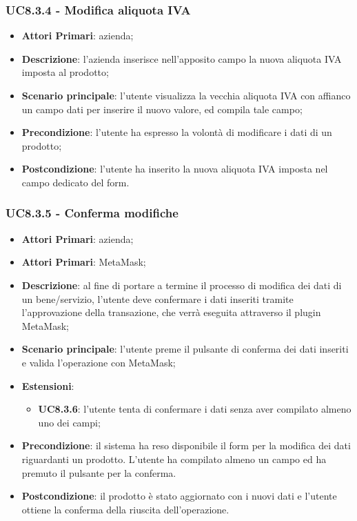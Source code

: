 \subsubsection{UC8.3.4 - Modifica aliquota IVA}
\begin{itemize}
	\item \textbf{Attori Primari}: azienda;
	\item \textbf{Descrizione}: l'azienda inserisce nell'apposito campo la 
	nuova aliquota IVA imposta al prodotto;
	\item \textbf{Scenario principale}: l'utente visualizza la vecchia aliquota 
	IVA con affianco un campo dati per inserire il nuovo valore, ed compila 
	tale campo;
	\item \textbf{Precondizione}: l'utente ha espresso la volontà di modificare i dati di un prodotto;
	\item \textbf{Postcondizione}: l'utente ha inserito la nuova aliquota IVA 
	imposta nel campo dedicato del form.
\end{itemize}

\subsubsection{UC8.3.5 - Conferma modifiche}
\begin{itemize}
	\item \textbf{Attori Primari}: azienda;
	\item \textbf{Attori Primari}: MetaMask\glo;
	\item \textbf{Descrizione}: al fine di portare a termine il processo di modifica dei dati di un bene/servizio, l'utente deve confermare i dati inseriti tramite l'approvazione della transazione, che verrà eseguita attraverso il plugin MetaMask\glo;
	\item \textbf{Scenario principale}: l'utente preme il pulsante di conferma dei dati inseriti e valida l'operazione con MetaMask\glo;
	\item \textbf{Estensioni}:
	\begin{itemize}
		\item \textbf{UC8.3.6}: l'utente tenta di confermare i dati senza aver compilato almeno uno dei campi;
	\end{itemize}
	\item \textbf{Precondizione}: il sistema ha reso disponibile il form per la modifica dei dati riguardanti un prodotto. L'utente ha compilato almeno un campo ed ha premuto il pulsante per la conferma.
	\item \textbf{Postcondizione}: il prodotto è stato aggiornato con i nuovi dati e l'utente ottiene la conferma della riuscita dell'operazione.
\end{itemize}


